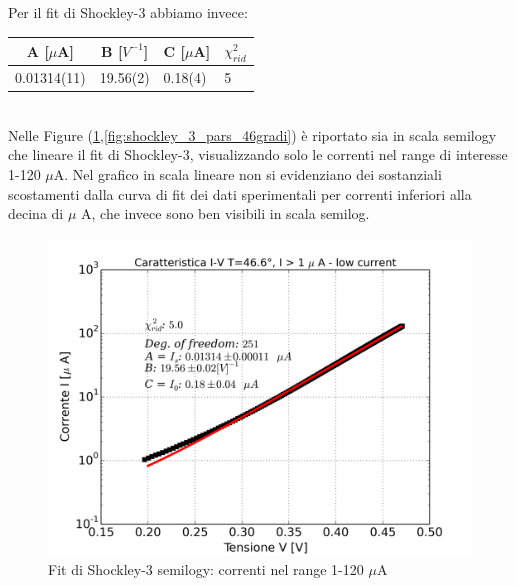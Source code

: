 \documentclass[a4paper]{article}
\begin{document}
Per il fit di Shockley-3 abbiamo invece:

\begin{table}[h]
\centering
\begin{tabular}{c|c|l|l}
 \textbf{A} [$\mu$A] & \textbf{B} [$V^{-1}$] & \textbf{C} [$\mu$A]  & $\chi_{rid}^2$\\ 
\hline 0.01314(11) & 19.56(2) & 0.18(4) & 5 \\
\end{tabular} 
\end{table}
~\\

Nelle Figure (\ref{fig:shockley_3_pars_46gradi_semilogy},\ref{fig:shockley_3_pars_46gradi}) è riportato sia in scala semilogy che lineare il fit di Shockley-3, visualizzando solo le correnti nel range di interesse 1-120 $\mu$A. Nel grafico in scala lineare non si evidenziano dei sostanziali scostamenti dalla curva di fit dei dati sperimentali per correnti inferiori alla decina di $\mu$ A, che invece sono ben visibili in scala semilog.\\

\begin{figure}
\centering
\includegraphics[width=0.9\linewidth]{./shockley_3_pars_46gradi_semilogy}
\caption{Fit di Shockley-3 semilogy: correnti nel range 1-120 $\mu$A}
\label{fig:shockley_3_pars_46gradi_semilogy}
\end{figure}
\end{document}
